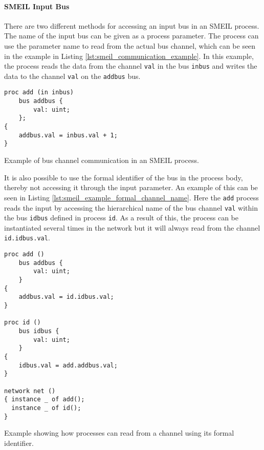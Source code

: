 \paragraph{SMEIL Input Bus}
There are two different methods for accessing an input bus in an SMEIL process. The name of the input bus can be given as a process parameter. The process can use the parameter name to read from the actual bus channel, which can be seen in the example in Listing \ref{lst:smeil_communication_example}. In this example, the process reads the data from the channel \texttt{val} in the bus \texttt{inbus} and writes the data to the channel \texttt{val} on the \texttt{addbus} bus.
\begin{listing}
\begin{verbatim}
proc add (in inbus)
    bus addbus {
        val: uint;
    };
{
    addbus.val = inbus.val + 1;
}
\end{verbatim}
\caption{Example of bus channel communication in an SMEIL process.}
\label{lst:smeil_communication_example}
\end{listing}

It is also possible to use the formal identifier of the bus in the process body, thereby not accessing it through the input parameter. An example of this can be seen in Listing \ref{lst:smeil_example_formal_channel_name}. Here the \texttt{add} process reads the input by accessing the hierarchical name of the bus channel \texttt{val} within the bus \texttt{idbus} defined in process \texttt{id}. As a result of this, the process can be instantiated several times in the network but it will always read from the channel \texttt{id.idbus.val}.
\begin{listing}
\begin{verbatim}
proc add ()
    bus addbus {
        val: uint;
    }
{
    addbus.val = id.idbus.val;
}

proc id ()
    bus idbus {
        val: uint;
    }
{
    idbus.val = add.addbus.val;
}

network net ()
{ instance _ of add();
  instance _ of id();
}
\end{verbatim}
\caption{Example showing how processes can read from a channel using its formal identifier.}
\label{lst:smeil_example_formal_channel_name}
\end{listing}
